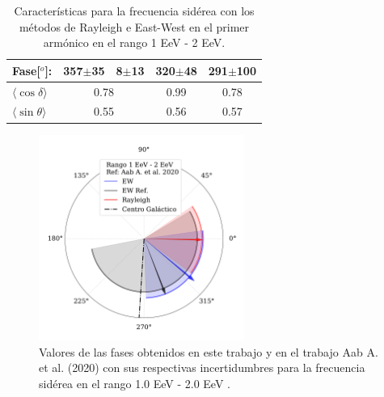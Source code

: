 \begin{table}[H]
\begin{small}
\begin{center}
\begin{tabular}[c]{l|c|c|c||c|}
\multicolumn{1}{|l|}{Fase[$^o$]:             }  & 357$\pm$35             & 8$\pm$13                   & 320$\pm$48                 & 291$\pm$100      \\\hline
\multicolumn{1}{|l|}{$\langle\cos\delta\rangle$}& \multicolumn{2}{c|}{0.78}& 0.99                              & 0.78       \\        
\multicolumn{1}{|l|}{$\langle\sin\theta\rangle$}& \multicolumn{2}{c|}{0.55}& 0.56                              & 0.57       \\ \hline       
\end{tabular}
            \end{center}
        \end{small}
        \caption{Características para la frecuencia sidérea con los métodos de Rayleigh  e East-West en el primer armónico en el rango 1 EeV - 2 EeV.}
        \label{tab:siderea_3}
    \end{table}

    \begin{figure}[H]
        \begin{small}
            \begin{center}
                \vspace*{-0.2 cm}
                \includegraphics[width=0.6\textwidth]{phase_tercer_bin_v3.pdf}
                \vspace*{-1 cm}
            \end{center}
        \caption{Valores de las fases obtenidos en este trabajo y en el trabajo Aab A. et al. (2020) con sus respectivas incertidumbres para la frecuencia sidérea en el  rango 1.0 EeV - 2.0 EeV .}
        \label{fig:tercer}
        \end{small}
    \end{figure}


